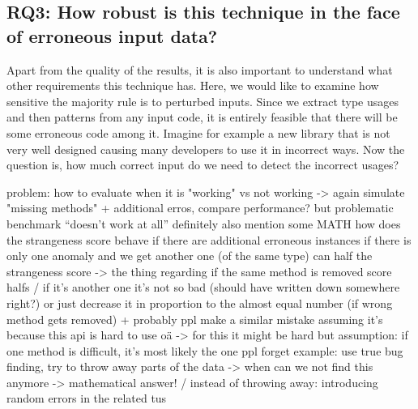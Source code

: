 \subsection{RQ3: How robust is this technique in the face of erroneous input data?}


Apart from the quality of the results, it is also important to understand what other requirements this technique has.
Here, we would like to examine how sensitive the majority rule is to perturbed inputs.
Since we extract type usages and then patterns from any input code, it is entirely feasible that there will be some erroneous code among it.
Imagine for example a new library that is not very well designed causing many developers to use it in incorrect ways.
Now the question is, how much correct input do we need to detect the incorrect usages?

problem: how to evaluate when it is "working" vs not working
    -> again simulate "missing methods" + additional erros, compare performance?
    but problematic benchmark ``doesn't work at all''
definitely also mention some MATH
    how does the strangeness score behave if there are additional erroneous instances
    if there is only one anomaly and we get another one (of the same type) can half the strangeness score
    -> the thing regarding if the same method is removed score halfs / if it's another one it's not so bad (should have written down somewhere right?)
    or just decrease it in proportion to the almost equal number (if wrong method gets removed)
    + probably ppl make a similar mistake assuming it's because this api is hard to use oä -> for this it might be hard
    but assumption: if one method is difficult, it's most likely the one ppl forget
example: use true bug finding, try to throw away parts of the data -> when can we not find this anymore -> mathematical answer!
/ instead of throwing away: introducing random errors in the related tus


